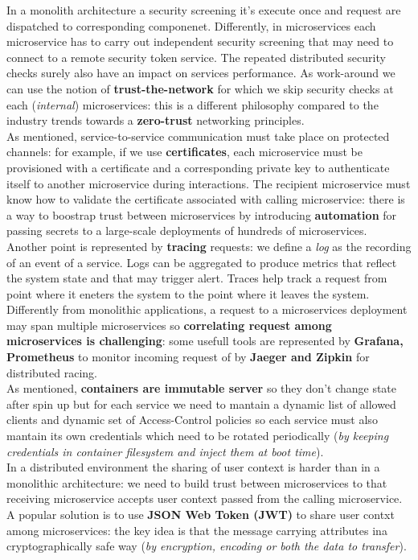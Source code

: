 \documentclass[10pt,a4paper]{report}
\begin{document}
In a monolith architecture a security screening it's execute once and request are dispatched to corresponding componenet. Differently, in microservices each microservice has to carry out independent security screening that may need to connect to a remote security token service. The repeated distributed security checks surely also have an impact on services performance. As work-around we can use the notion of \textbf{trust-the-network} for which we skip security checks at each (\textit{internal}) microservices: this is a different philosophy compared to the industry trends towards a \textbf{zero-trust} networking principles. \\
As mentioned, service-to-service communication must take place on protected channels: for example, if we use \textbf{certificates}, each microservice must be provisioned with a certificate and a corresponding private key to authenticate itself to another microservice during interactions. The recipient microservice must know how to validate the certificate associated with calling microservice: there is a way to boostrap trust between microservices by introducing \textbf{automation} for passing secrets to a large-scale deployments of hundreds of microservices.\\
Another point is represented by \textbf{tracing} requests: we define a \textit{log} as the recording of an event of a service. Logs can be aggregated to produce metrics that reflect the system state and that may trigger alert. Traces help track a request from point where it eneters the system to the point where it leaves the system. Differently from monolithic applications, a request to a microservices deployment may span multiple microservices so \textbf{correlating request among microservices is challenging}: some usefull tools are represented by \textbf{Grafana, Prometheus} to monitor incoming request of by \textbf{Jaeger and Zipkin} for distributed racing. \\
As mentioned, \textbf{containers are immutable server} so they don't change state after spin up but for each service we need to mantain a dynamic list of allowed clients and dynamic set of Access-Control policies so each service must also mantain its own credentials which need to be rotated periodically (\textit{by keeping credentials in container filesystem and inject them at boot time}). \\
In a distributed environment the sharing of user context is harder than in a monolithic architecture: we need to build trust between microservices to that receiving microservice accepts user context passed from the calling microservice. A popular solution is to use \textbf{JSON Web Token (JWT)} to share user contxt among microservices: the key idea is that the message carrying attributes ina cryptographically safe way (\textit{by encryption, encoding or both the data to transfer}).
\end{document}
